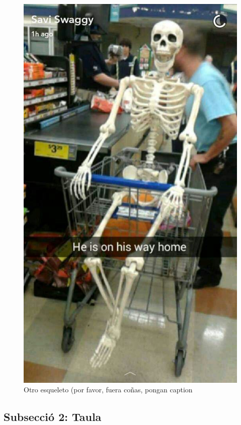 \documentclass{article}
\begin{document}
\begin{figure}[H]
\begin{minipage}{.4\textwidth}
        \label{fig:Section1_dobleImagen1}
    \end{minipage}%
    \begin{minipage}{.4\textwidth}
        \centering
        \includegraphics[width=0.95\linewidth]{Images/Section1/doble_imagen2.jpg}
        \caption{Otro esqueleto (por favor, fuera coñas, pongan caption}
        \label{fig:Section1_dobleImagen2}
    \end{minipage}%
\end{figure}

\subsection{Subsecció 2: Taula}
\end{document}
